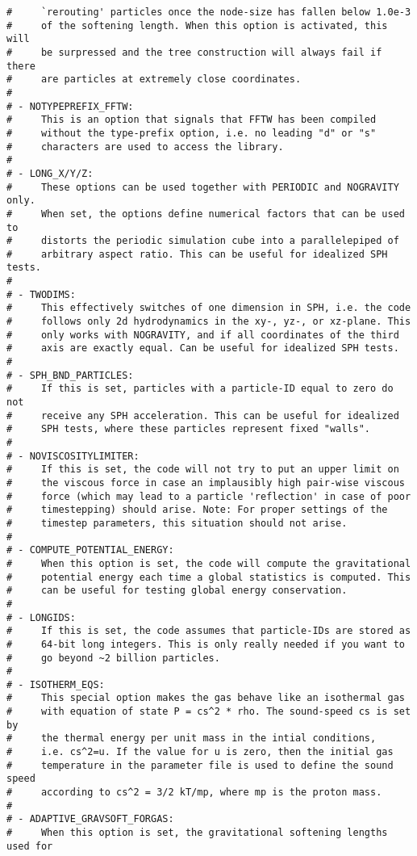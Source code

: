 \documentclass[a4paper,english,10.5pt]{scrartcl}
\begin{document}
\begin{verbatim}
#     `rerouting' particles once the node-size has fallen below 1.0e-3
#     of the softening length. When this option is activated, this will
#     be surpressed and the tree construction will always fail if there
#     are particles at extremely close coordinates.
#
# - NOTYPEPREFIX_FFTW:
#     This is an option that signals that FFTW has been compiled
#     without the type-prefix option, i.e. no leading "d" or "s"
#     characters are used to access the library.
#
# - LONG_X/Y/Z: 
#     These options can be used together with PERIODIC and NOGRAVITY only.
#     When set, the options define numerical factors that can be used to
#     distorts the periodic simulation cube into a parallelepiped of 
#     arbitrary aspect ratio. This can be useful for idealized SPH tests.
#
# - TWODIMS:
#     This effectively switches of one dimension in SPH, i.e. the code
#     follows only 2d hydrodynamics in the xy-, yz-, or xz-plane. This
#     only works with NOGRAVITY, and if all coordinates of the third
#     axis are exactly equal. Can be useful for idealized SPH tests.
#
# - SPH_BND_PARTICLES:
#     If this is set, particles with a particle-ID equal to zero do not
#     receive any SPH acceleration. This can be useful for idealized
#     SPH tests, where these particles represent fixed "walls".
#
# - NOVISCOSITYLIMITER:   
#     If this is set, the code will not try to put an upper limit on
#     the viscous force in case an implausibly high pair-wise viscous
#     force (which may lead to a particle 'reflection' in case of poor
#     timestepping) should arise. Note: For proper settings of the
#     timestep parameters, this situation should not arise.
#
# - COMPUTE_POTENTIAL_ENERGY:
#     When this option is set, the code will compute the gravitational
#     potential energy each time a global statistics is computed. This
#     can be useful for testing global energy conservation.
#
# - LONGIDS: 
#     If this is set, the code assumes that particle-IDs are stored as
#     64-bit long integers. This is only really needed if you want to
#     go beyond ~2 billion particles.
#
# - ISOTHERM_EQS:
#     This special option makes the gas behave like an isothermal gas
#     with equation of state P = cs^2 * rho. The sound-speed cs is set by 
#     the thermal energy per unit mass in the intial conditions, 
#     i.e. cs^2=u. If the value for u is zero, then the initial gas 
#     temperature in the parameter file is used to define the sound speed
#     according to cs^2 = 3/2 kT/mp, where mp is the proton mass.
#
# - ADAPTIVE_GRAVSOFT_FORGAS:
#     When this option is set, the gravitational softening lengths used for

\end{verbatim}
\end{document}

